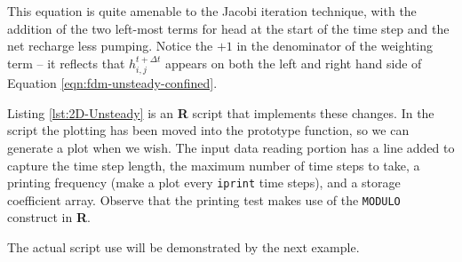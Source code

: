 This equation is quite amenable to the Jacobi iteration technique, with the addition of the two left-most terms for head at the start of the time step and the net recharge less pumping. 
Notice the $+1$ in the denominator of the weighting term -- it reflects that $h_{i,j}^{t+\Delta t}$ appears on both the left and right hand side of Equation \ref{eqn:fdm-unsteady-confined}.

Listing \ref{lst:2D-Unsteady} is an \textbf{R} script that implements these changes.
In the script the plotting has been moved into the prototype function, so we can generate a plot when we wish.
The input data reading portion has a line added to capture the time step length, the maximum number of time steps to take, a printing frequency (make a plot every \texttt{iprint} time steps), and a storage coefficient array.
Observe that the printing test makes use of the \texttt{MODULO} construct in \textbf{R}.

The actual script use will be demonstrated by the next example.

